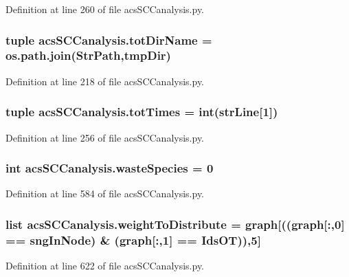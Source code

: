 Definition at line 260 of file acs\-S\-C\-Canalysis.\-py.

\hypertarget{a00102_a5903034df3d32525785e697152efbeb3}{
\subsubsection[{tot\-Dir\-Name}]{\setlength{\rightskip}{0pt plus 5cm}tuple acs\-S\-C\-Canalysis.\-tot\-Dir\-Name = os.\-path.\-join({\bf Str\-Path},tmp\-Dir)}}\label{a00102_a5903034df3d32525785e697152efbeb3}


Definition at line 218 of file acs\-S\-C\-Canalysis.\-py.

\hypertarget{a00102_a20df40e09bc9514382d71f15783c7856}{
\subsubsection[{tot\-Times}]{\setlength{\rightskip}{0pt plus 5cm}tuple acs\-S\-C\-Canalysis.\-tot\-Times = int({\bf str\-Line}\mbox{[}1\mbox{]})}}\label{a00102_a20df40e09bc9514382d71f15783c7856}


Definition at line 256 of file acs\-S\-C\-Canalysis.\-py.

\hypertarget{a00102_ace0de61f3c6aa14b4197156be3a68280}{
\subsubsection[{waste\-Species}]{\setlength{\rightskip}{0pt plus 5cm}int acs\-S\-C\-Canalysis.\-waste\-Species = 0}}\label{a00102_ace0de61f3c6aa14b4197156be3a68280}


Definition at line 584 of file acs\-S\-C\-Canalysis.\-py.

\hypertarget{a00102_a5162bfbe5eb2618736d1f77bb3125a9b}{
\subsubsection[{weight\-To\-Distribute}]{\setlength{\rightskip}{0pt plus 5cm}list acs\-S\-C\-Canalysis.\-weight\-To\-Distribute = {\bf graph}\mbox{[}(({\bf graph}\mbox{[}\-:,0\mbox{]} == sng\-In\-Node) \& ({\bf graph}\mbox{[}\-:,1\mbox{]} == Ids\-O\-T)),5\mbox{]}}}\label{a00102_a5162bfbe5eb2618736d1f77bb3125a9b}


Definition at line 622 of file acs\-S\-C\-Canalysis.\-py.

